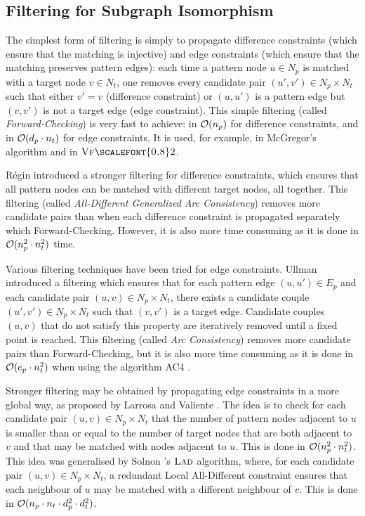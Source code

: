 \documentclass{llncs}
\newcommand{\VFtwo}{$\textsc{Vf{\scalefont{0.8}2}}$\xspace}
\newcommand{\LAD}{$\textsc{Lad}$\xspace}
\begin{document}
\subsection{Filtering for Subgraph Isomorphism}

The simplest form of filtering is simply to propagate difference constraints (which ensure that the
matching is injective) and edge constraints (which ensure that the matching preserves pattern
edges): each time a pattern node $u\in N_p$ is matched with a target node $v\in N_t$, one removes
every candidate pair $(u',v')\in N_p\times N_t$ such that either $v'=v$ (difference constraint) or
$(u,u')$ is a pattern edge but $(v,v')$ is not a target edge (edge constraint). This simple
filtering (called \emph{Forward-Checking}) is very fast to achieve: in ${\cal O}(n_p)$ for
difference constraints, and in ${\cal O}(d_p\cdot n_t)$ for edge constraints. It is used, for
example, in McGregor's algorithm \cite{mcgregor79} and in \VFtwo \cite{Cordella:2004}.

R\'egin \cite{regin} introduced a stronger filtering for difference constraints, which ensures that
all pattern nodes can be matched with different target nodes, all together. This filtering (called
\emph{All-Different Generalized Arc Consistency}) removes more candidate pairs than when each
difference constraint is propagated separately which Forward-Checking. However, it is also more time
consuming as it is done in ${\cal O}(n_p^2\cdot n_t^2)$ time.

Various filtering techniques have been tried for edge constraints. Ullman \cite{ullman} introduced a
filtering which ensures that for each pattern edge $(u,u')\in E_p$ and each candidate pair $(u,v)\in
N_p\times N_t$, there exists a candidate couple $(u',v')\in N_p\times N_t$ such that $(v,v')$ is a
target edge. Candidate couples $(u,v)$ that do not satisfy this property are iteratively removed
until a fixed point is reached. This filtering (called \emph{Arc Consistency}) removes more
candidate pairs than Forward-Checking, but it is also more time consuming as it is done in ${\cal
O}(e_p\cdot n_t^2)$ when using the algorithm AC4  \cite{MH86}.

Stronger filtering may be obtained by propagating edge constraints in a more global way, as proposed
by Larrosa and Valiente \cite{LV02}. The idea is to check for each candidate pair $(u,v)\in
N_p\times N_t$ that the number of pattern nodes adjacent to $u$ is smaller than or equal to the
number of target nodes that are both adjacent to $v$ and that may be matched with nodes adjacent to
$u$. This is done in ${\cal O}(n_p^2\cdot n_t^2)$. This idea was generalised by Solnon
\cite{Solnon:2010}'s \LAD algorithm, where, for each candidate pair $(u,v)\in N_p\times N_t$, a redundant Local
All-Different constraint ensures that each neighbour of $u$ may be matched with a different
neighbour of $v$. This is done in ${\cal O}(n_p\cdot n_t\cdot d_p^2\cdot d_t^2)$.
\end{document}
